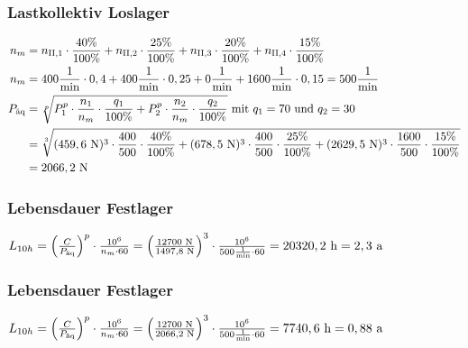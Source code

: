 \subsubsection{Lastkollektiv Loslager}
\begin{align*}
	n_m &= n_{\mathord{\mathrm{II}},1} \cdot \frac{40 \%}{100 \%} + n_{\mathord{\mathrm{II}},2} \cdot \frac{25 \%}{100 \%} + n_{\mathord{\mathrm{II}},3} \cdot \frac{20 \%}{100 \%} + n_{\mathord{\mathrm{II}},4} \cdot \frac{15 \%}{100 \%} \\
	n_m &= 400 \frac{1}{\text{min}} \cdot 0,4 + 400 \frac{1}{\text{min}} \cdot 0,25 + 0 \frac{1}{\text{min}} + 1600 \frac{1}{\text{min}} \cdot 0,15 = 500 \frac{1}{\text{min}} \\
	P_{\text{äq}} &= \sqrt[p]{P_1 ^{p} \cdot \frac{n_1}{n_m} \cdot \frac{q_1}{100\% } + P_2 ^{p} \cdot \frac{n_2}{n_m} \cdot \frac{q_2}{100 \%}} \text{ mit $q_1 = 70$ und $q_2= 30$} \\
	&= \sqrt[3]{(459,6 \text{ N}) ^{3} \cdot \frac{400}{500} \cdot \frac{40 \%}{100 \%} +(678,5 \text{ N} )^{3} \cdot \frac{400}{500} \cdot \frac{25 \%}{100\% } +(2629,5 \text{ N} )^{3} \cdot \frac{1600}{500} \cdot \frac{15 \%}{100\% }} \\
	&= 2066,2 \text{ N}
\end{align*}

\subsubsection{Lebensdauer Festlager}
$L_{10h}= \left( \frac{C}{P_{\text{äq}}} \right) ^p \cdot \frac{10^6}{n_m \cdot 60} = \left( \frac{12700 \text{ N}}{1497,8 \text{ N}} \right) ^3 \cdot \frac{10^6}{500 \frac{1}{\text{min}} \cdot 60} = 20320,2 \text{ h} = 2,3 \text{ a}$

\subsubsection{Lebensdauer Festlager}
$L_{10h}= \left( \frac{C}{P_{\text{äq}}} \right) ^p \cdot \frac{10^6}{n_m \cdot 60} = \left( \frac{12700 \text{ N}}{2066,2 \text{ N}} \right) ^3 \cdot \frac{10^6}{500 \frac{1}{\text{min}} \cdot 60} = 7740,6 \text{ h} = 0,88 \text{ a}$